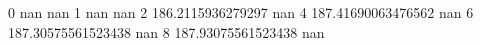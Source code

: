 0 nan nan
1 nan nan
2 186.2115936279297 nan
4 187.41690063476562 nan
6 187.30575561523438 nan
8 187.93075561523438 nan
